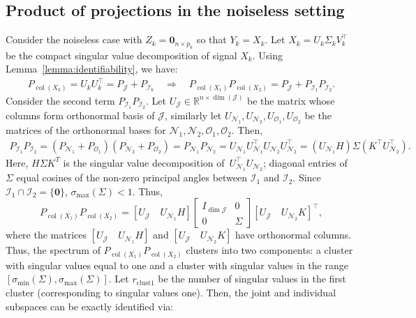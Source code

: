 \documentclass{amsart}
\def\R{\mathbb{R}} %
\DeclareMathOperator*{\col}{col}
\newcommand{\Ncal}{\mathcal{N}}
\newcommand{\Ocal}{\mathcal{O}}
\newcommand{\Jcal}{\mathcal{J}}
\newcommand{\Ical}{\mathcal{I}}
\newtheorem{example}{Example}
\begin{document}
\subsection{Product of projections in the noiseless setting}\label{sec:noiseless}
    Consider the noiseless case with $Z_k = \mathbf{0}_{n\times p_k}$ so that $Y_k = X_k$. Let $X_k = U_k \Sigma_k V_k^\top$ be the compact singular value decomposition of signal $X_k$. Using Lemma~\ref{lemma:identifiability}, we have:
    \begin{align*}
    P_{\col(X_k)} = U_k U_k^\top = P_{\Jcal} + P_{\Ical_k}
    \quad\Rightarrow \quad P_{\col (X_{1})} P_{\col (X_2)} = P_{\Jcal} + P_{\Ical_1}P_{\Ical_2}.
    \end{align*}
    Consider the second term $P_{\Ical_1}P_{\Ical_2}$. Let $U_{\Jcal} \in \R^{n\times \dim(\Jcal)}$ be the matrix whose columns form orthonormal basis of $\Jcal$, similarly let $U_{\Ncal_1}, U_{\Ncal_2}, U_{\Ocal_1}, U_{\Ocal_2}$ be the matrices of the orthonormal bases for $\Ncal_1, \Ncal_2, \Ocal_1, \Ocal_2$.  Then,
    \begin{align*}
        P_{\Ical_1} P_{\Ical_2} = (P_{\Ncal_1} + P_{\Ocal_1})(P_{\Ncal_2} + P_{\Ocal_2})
        = P_{\Ncal_1} P_{\Ncal_2}
        = U_{\Ncal_1} {U_{\Ncal_1}^\top U_{\Ncal_2}}{ U_{\Ncal_2}^{\top}}
        = \left(U_{\Ncal_1} H \right)\Sigma \left(K^\top U_{\Ncal_2}^\top \right).
    \end{align*}
   Here, $H\Sigma{K}^{T}$ is the singular value decomposition of $U_{\Ncal_1}^\top U_{\Ncal_2}$; diagonal entries of $\Sigma$ equal cosines of the non-zero principal angles between $\Ical_1$ and $\Ical_2$. Since $\Ical_1 \cap \Ical_2 = \{\mathbf{0}\}$, $\sigma_{\max}(\Sigma) < 1$. Thus,
    $$
    P_{\col (X_1)} P_{\col (X_2)} = \left [U_{\Jcal}\quad U_{\Ncal_1} H \right] \begin{bmatrix}
        I_{\dim \Jcal} & 0 \\
        0 & \Sigma 
    \end{bmatrix} \left [U_{\Jcal}\quad U_{\Ncal_2} K\right]^\top,
    $$
    where the matrices $\left[U_{\mathcal{J}}\quad U_{\Ncal_1} H\right]$ and $\left[U_{\mathcal{J}}\quad U_{\Ncal_2} K\right]$ { have orthonormal columns}. Thus, the spectrum of $P_{\col (X_1)} P_{\col (X_2)}$ clusters into two components: a cluster with singular values equal to one and a cluster with singular values in the range $[\sigma_{\min}(\Sigma),\sigma_{\max}(\Sigma)]$. Let $r_{\text{clust1}}$ be the number of singular values in the first cluster (corresponding to singular values one). Then, the joint and individual subspaces can be exactly identified via:
\end{document}
